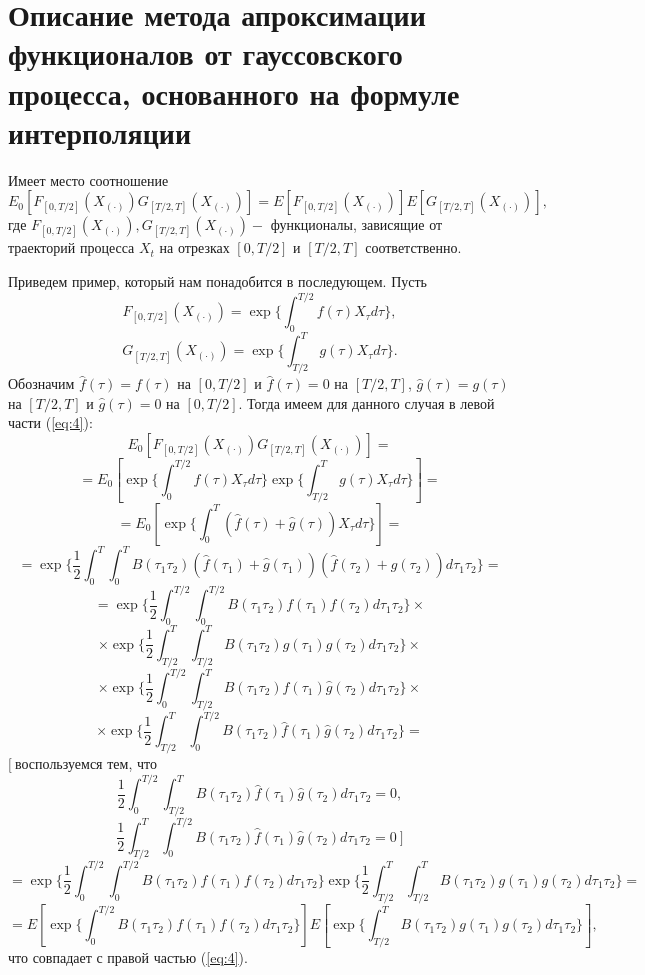 \documentclass [12pt]{report}
\begin{document}
\pagebreak

\chapter{Описание метода апроксимации функционалов от гауссовского процесса, основанного на формуле интерполяции}

Имеет место соотношение
\begin{equation}
E_0[F_{[0,T/2]}(X_{(\cdot)})G_{[T/2,T]}(X_{(\cdot)})]=
E[F_{[0,T/2]}(X_{(\cdot)})]E[G_{[T/2,T]}(X_{(\cdot)})],
\label{eq:4}
\end{equation}
где $F_{[0,T/2]}(X_{(\cdot)}), G_{[T/2,T]}(X_{(\cdot)}) - $
функционалы, зависящие от траекторий процесса $X_t$ на
отрезках $[0,T/2]$ и $[T/2, T]$ соответственно.

Приведем пример, который нам понадобится в последующем. Пусть
$$
F_{[0,T/2]}(X_{(\cdot)}) = \exp\{\int_{0}^{T/2}f(\tau)X_{\tau}d\tau\},
$$
$$
G_{[T/2,T]}(X_{(\cdot)}) = \exp\{\int_{T/2}^{T}g(\tau)X_{\tau}d\tau\}.
$$
Обозначим $\hat{f}(\tau)=f(\tau)$ на $[0, T/2]$
и $\hat{f}(\tau)=0$ на $[T/2, T]$,
$\hat{g}(\tau)=g(\tau)$ на $[T/2, T]$
и $\hat{g}(\tau)=0$ на $[0, T/2]$.
Тогда имеем для данного случая в левой части (\ref{eq:4}):
$$
E_0[F_{[0,T/2]}(X_{(\cdot)})G_{[T/2,T]}(X_{(\cdot)})]=
$$
$$
=E_0[\exp\{\int_{0}^{T/2} f(\tau)X_{\tau}d\tau\}
\exp\{\int_{T/2}^{T} g(\tau)X_{\tau}d\tau\}]=
$$
$$
=E_0[\exp\{\int_{0}^{T}(\hat{f}(\tau)+\hat{g}(\tau))X_{\tau}d\tau\}]=
$$
$$
=\exp\{\frac{1}{2}\int_{0}^{T}\int_{0}^{T}B(\tau_1\tau_2)
(\hat{f}(\tau_1)+\hat{g}(\tau_1))(\hat{f}(\tau_2)+\hat{g}(\tau_2))
d\tau_1\tau_2\}=
$$
$$
= \exp\{\frac{1}{2}\int_{0}^{T/2}\int_{0}^{T/2}B(\tau_1\tau_2)
f(\tau_1)f(\tau_2)d\tau_1\tau_2\} \times
$$
$$
\times \exp\{\frac{1}{2}\int_{T/2}^{T}\int_{T/2}^{T}B(\tau_1\tau_2)
g(\tau_1)g(\tau_2)d\tau_1\tau_2\} \times
$$
$$
\times \exp\{\frac{1}{2}\int_{0}^{T/2}\int_{T/2}^{T}B(\tau_1\tau_2)
\hat{f}(\tau_1)\hat{g}(\tau_2)d\tau_1\tau_2\} \times
$$
$$
\times \exp\{\frac{1}{2}\int_{T/2}^{T}\int_{0}^{T/2}B(\tau_1\tau_2)
\hat{f}(\tau_1)\hat{g}(\tau_2)d\tau_1\tau_2\} =
$$
$\big[~$воспользуемся тем, что
$$
\frac{1}{2}\int_{0}^{T/2}\int_{T/2}^{T}B(\tau_1\tau_2)
\hat{f}(\tau_1)\hat{g}(\tau_2)d\tau_1\tau_2 = 0,
$$
$$
\frac{1}{2}\int_{T/2}^{T}\int_{0}^{T/2}B(\tau_1\tau_2)
\hat{f}(\tau_1)\hat{g}(\tau_2)d\tau_1\tau_2 = 0 ~\big]
$$
$$
= \exp\{\frac{1}{2}\int_{0}^{T/2}\int_{0}^{T/2}B(\tau_1\tau_2)
f(\tau_1)f(\tau_2)d\tau_1\tau_2\}
\exp\{\frac{1}{2}\int_{T/2}^{T}\int_{T/2}^{T}B(\tau_1\tau_2)
g(\tau_1)g(\tau_2)d\tau_1\tau_2\} =
$$
$$
= E[\exp\{\int_{0}^{T/2}B(\tau_1\tau_2)
f(\tau_1)f(\tau_2)d\tau_1\tau_2\}]
E[\exp\{\int_{T/2}^{T}B(\tau_1\tau_2)
g(\tau_1)g(\tau_2)d\tau_1\tau_2\}],
$$
что совпадает с правой частью (\ref{eq:4}).
\end{document}
